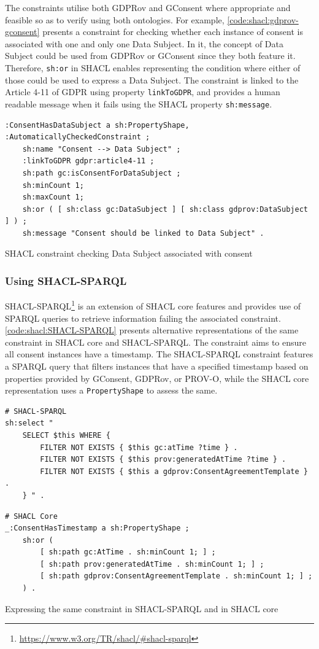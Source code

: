 The constraints utilise both GDPRov and GConsent where appropriate and feasible so as to verify using both ontologies. For example, \autoref{code:shacl:gdprov-gconsent} presents a constraint for checking whether each instance of consent is associated with one and only one Data Subject. In it, the concept of Data Subject could be used from GDPRov or GConsent since they both feature it. Therefore, \texttt{sh:or} in SHACL enables representing the condition where either of those could be used to express a Data Subject.
The constraint is linked to the Article 4-11 of GDPR using property \texttt{linkToGDPR}, and provides a human readable message when it fails using the SHACL property \texttt{sh:message}.
\begin{listing}[htbp]
\begin{verbatim}
:ConsentHasDataSubject a sh:PropertyShape, :AutomaticallyCheckedConstraint ;
    sh:name "Consent --> Data Subject" ;
    :linkToGDPR gdpr:article4-11 ;
    sh:path gc:isConsentForDataSubject ;
    sh:minCount 1;
    sh:maxCount 1;
    sh:or ( [ sh:class gc:DataSubject ] [ sh:class gdprov:DataSubject ] ) ;
    sh:message "Consent should be linked to Data Subject" .
\end{verbatim}
\caption{SHACL constraint checking Data Subject associated with consent}
\label{code:shacl:gdprov-gconsent}
\end{listing}

\subsubsection{Using SHACL-SPARQL}

SHACL-SPARQL\footnote{\url{https://www.w3.org/TR/shacl/\#shacl-sparql}} is an extension of SHACL core features and provides use of SPARQL queries to retrieve information failing the associated constraint. \autoref{code:shacl:SHACL-SPARQL} presents alternative representations of the same constraint in SHACL core and SHACL-SPARQL.
The constraint aims to ensure all consent instances have a timestamp.
The SHACL-SPARQL constraint features a SPARQL query that filters instances that have a specified timestamp based on properties provided by GConsent, GDPRov, or PROV-O, while the SHACL core representation uses a \texttt{PropertyShape} to assess the same.
\begin{listing}[htbp]
\begin{verbatim}
# SHACL-SPARQL
sh:select "
    SELECT $this WHERE {
        FILTER NOT EXISTS { $this gc:atTime ?time } .
        FILTER NOT EXISTS { $this prov:generatedAtTime ?time } .
        FILTER NOT EXISTS { $this a gdprov:ConsentAgreementTemplate } .
    } " .
\end{verbatim}
\begin{verbatim}
# SHACL Core
_:ConsentHasTimestamp a sh:PropertyShape ;
    sh:or (
        [ sh:path gc:AtTime . sh:minCount 1; ] ;
        [ sh:path prov:generatedAtTime . sh:minCount 1; ] ;
        [ sh:path gdprov:ConsentAgreementTemplate . sh:minCount 1; ] ;
    ) .
\end{verbatim}
\caption{Expressing the same constraint in SHACL-SPARQL and in SHACL core}
\label{code:shacl:SHACL-SPARQL}
\end{listing}

